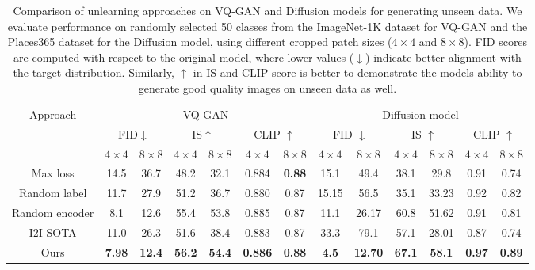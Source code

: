 \begin{table*}[h]
    \centering
    \begin{tabular}{ccccccc||cccccc}
      \toprule
      \multirow{3}{*}{Approach} & \multicolumn{6}{c||}{VQ-GAN} & \multicolumn{6}{c}{Diffusion model} \\
      & \multicolumn{2}{c}{FID$\downarrow$} & \multicolumn{2}{c}{IS$\uparrow$} & \multicolumn{2}{c||}{CLIP $\uparrow$ } & \multicolumn{2}{c}{FID $\downarrow$ } & \multicolumn{2}{c}{IS $\uparrow$} & \multicolumn{2}{c}{CLIP $\uparrow$} \\ \cline{2-13}
      & $4 \times 4$ & $8 \times 8$ & $4 \times 4$ & $8 \times 8$ & $4 \times 4$ & $8 \times 8$ & $4 \times 4$ & $8 \times 8$ & $4 \times 4$ & $8 \times 8$ & $4 \times 4$ & $8 \times 8$ \\
      \hline
      Max loss & 14.5 & 36.7 & 48.2 & 32.1 & 0.884 & \textbf{0.88} & 15.1 & 49.4 & 38.1 & 29.8 & 0.91 & 0.74 \\
      Random label & 11.7 & 27.9 & 51.2 & 36.7 & 0.880 & 0.87 & 15.15 & 56.5 & 35.1 & 33.23 & 0.92 & 0.82 \\
      Random encoder & 8.1 & 12.6 & 55.4 & 53.8 & 0.885 & 0.87 & 11.1 & 26.17 & 60.8 & 51.62 & 0.91 & 0.81 \\
      I2I SOTA & 11.0 & 26.3 & 51.6 & 38.4 & 0.883 & 0.87 & 33.3 & 79.1 & 57.1 & 28.01 & 0.87 & 0.74 \\
      Ours & \textbf{7.98} & \textbf{12.4} & \textbf{56.2} & \textbf{54.4} & \textbf{0.886} & \textbf{0.88} & \textbf{4.5} & \textbf{12.70} & \textbf{67.1} & \textbf{58.1} & \textbf{0.97} & \textbf{0.89} \\
      \bottomrule
    \end{tabular}
    \caption{Comparison of unlearning approaches on VQ-GAN and Diffusion models for generating unseen data. We evaluate performance on randomly selected 50 classes from the ImageNet-1K dataset for VQ-GAN and the Places365 dataset for the Diffusion model, using different cropped patch sizes ($4 \times 4$ and $8 \times 8$).  FID scores are computed with respect to the original model, where lower values ($\downarrow$) indicate better alignment with the target distribution. Similarly, $\uparrow$ in IS and CLIP score is better to demonstrate the models ability to generate good quality images on unseen data as well.}
    

\end{table*}
